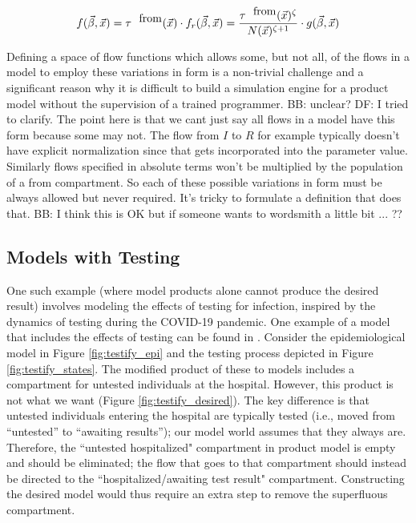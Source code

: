 \documentclass[pdflatex,sn-basic]{sn-jnl}%
\theoremstyle{definition}
\newcommand{\ben}[1]{{\color{brown} BB: #1}}
\newcommand{\df}[1]{{\color{orange} DF: #1}}
\newcommand{\betavec}{\vec{\beta}}
\newcommand{\xvec}{\vec{x}}
\newcommand{\tauf}{\tau^{\mbox{\tiny from}}}
\begin{document}
\begin{equation}
    f(\betavec, \xvec) = \tauf(\xvec)\cdot f_r(\betavec, \xvec) = \frac{\tauf(\xvec)^\zeta}{N(\xvec)^{\zeta + 1}} \cdot g(\betavec, \xvec)
\end{equation}

Defining a space of flow functions which allows some, but not all, of the flows in a model to employ these variations in form is a non-trivial challenge and a significant reason why it is difficult to build a simulation engine for a product model without the supervision of a trained programmer.
\ben{unclear?} \df{I tried to clarify. The point here is that we cant just say all flows in a model have this form because some may not. The flow from $I$ to $R$ for example typically doesn't have explicit normalization since that gets incorporated into the parameter value. Similarly flows specified in absolute terms won't be multiplied by the population of a from compartment. So each of these possible variations in form must be always allowed but never required. It's tricky to formulate a definition that does that.} \ben{I think this is OK but if someone wants to wordsmith a little bit ... ??}

\subsection{Models with Testing}\label{testing}

One such example (where model products alone cannot produce the desired result) involves modeling the effects of testing for infection, inspired by the dynamics of testing during the COVID-19 pandemic. One example of a model that includes the effects of testing can be found in \cite{gharouni2022testing}. Consider the epidemiological model in Figure \ref{fig:testify_epi} and the testing process depicted in Figure \ref{fig:testify_states}. The modified product of these to models includes a compartment for untested individuals at the hospital. However, this product is not what we want (Figure \ref{fig:testify_desired}). 
The key difference is that untested individuals entering the hospital are typically tested (i.e., moved from ``untested'' to ``awaiting results''); our model world assumes that they always are.
Therefore, the “untested hospitalized" compartment in product model is empty  and should be eliminated; the flow that goes to that compartment should instead be directed to the “hospitalized/awaiting test result" compartment. Constructing the desired model would thus require an extra step to remove the superfluous compartment.
\end{document}
